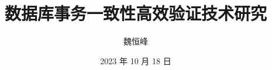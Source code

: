 \documentclass[]{beamer}
\title[事务一致性验证]{数据库事务一致性高效验证技术研究}
\subtitle{}
\author[魏恒峰]{魏恒峰}
\institute{hfwei@nju.edu.cn}
\date{2023 年 10 月 18 日}
\begin{document}
\maketitle





\thankyou{}
\end{document}
